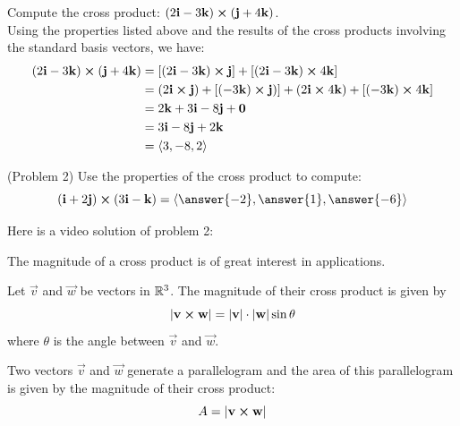 \documentclass[handout]{ximera}
\begin{document}
\begin{example}[Example 2]
Compute the cross product: $(2\mathbf{i} - 3\mathbf{k}) \boldsymbol\times (\mathbf{j} + 4\mathbf{k})$.\\
Using the properties listed above and the results of the cross products involving the standard basis vectors, we have:
\begin{align*}
(2\mathbf{i} - 3\mathbf{k}) \boldsymbol\times (\mathbf{j} + 4\mathbf{k}) & = [(2\mathbf{i} - 3\mathbf{k}) \boldsymbol\times \mathbf{j}] + [(2\mathbf{i} - 3\mathbf{k}) \boldsymbol\times   4\mathbf{k}]\\
                                  &= (2\mathbf{i} \boldsymbol\times \mathbf{j}) + [(-3\mathbf{k}) \boldsymbol\times \mathbf{j})] +(2\mathbf{i} \boldsymbol\times   4\mathbf{k}) + [ (- 3\mathbf{k}) \boldsymbol\times   4\mathbf{k}]\\
                                  &= 2\mathbf{k} + 3 \mathbf{i} -8\mathbf{j} + \mathbf{0}\\
                                  &= 3\mathbf{i} - 8\mathbf{j} +2\mathbf{k}\\
                                  &= \left\langle 3, -8, 2\right\rangle
\end{align*}
\end{example}

\begin{problem}(Problem 2)
Use the properties of the cross product to compute: 
\[
(\vec{i} + 2\vec{j}) \cross (3\vec{i} - \vec{k}) = \vector{\answer{-2},\answer{1},\answer{-6}}
\]
\end{problem}

Here is a video solution of problem 2:\\
\begin{foldable}
\end{foldable}

The magnitude of a cross product is of great interest in applications.
\begin{proposition}
Let $\vec{v}$ and $\vec{w}$ be vectors in $\mathbb R^3$. The magnitude of their cross product is given by
\[
|\mathbf{v} \boldsymbol\times \mathbf{w}| = |\mathbf{v}| \cdot |\mathbf{w}| \sin \theta
\]
where $\theta$ is the angle between $\vec{v}$ and $\vec{w}$.
\end{proposition}

Two vectors $\vec{v}$ and $\vec{w}$ generate a parallelogram and the area of this parallelogram is given by the magnitude of their cross product:
\[
A = |\mathbf{v} \boldsymbol\times \mathbf{w}|
\]

\begin{image}
\end{image}
\end{document}
